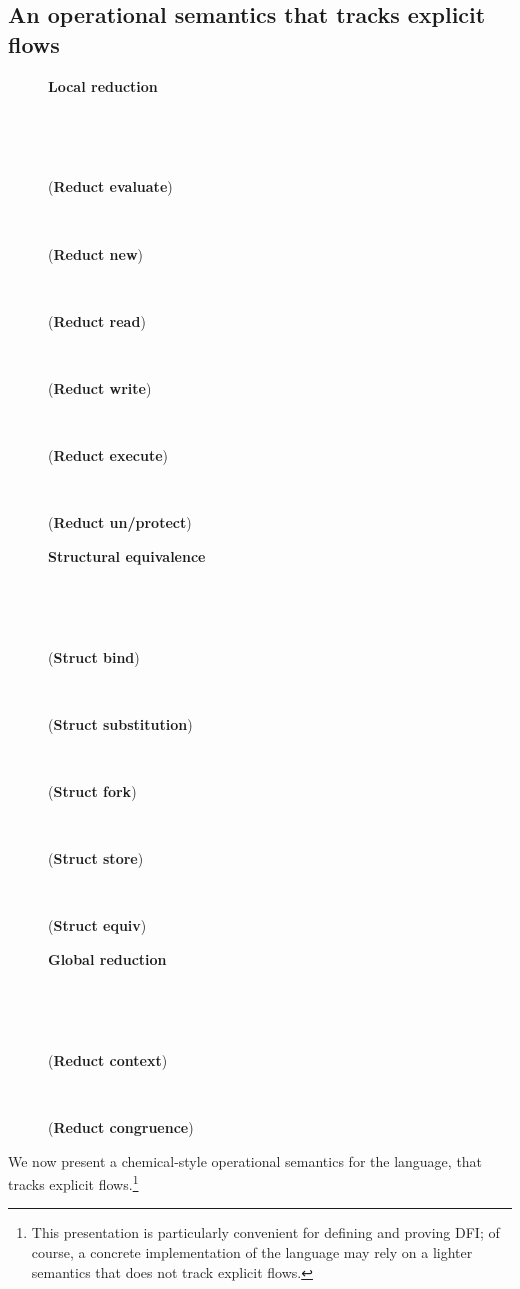 \documentclass{sigplanconf}
\def\upbracketfill{}
\def\downbracketfill{}
\newcommand{\cenvvv}[3]{\vspace{0.8mm}
\begin{flushleft}
\parbox{8.4cm}{{\bf #1} }
\\
\parbox{8.4cm}{\downbracketfill}
\\
\vspace{-0.2cm}
\end{flushleft}
#3
\begin{flushleft}
\parbox{8.4cm}{\upbracketfill}
\end{flushleft}}
\newcommand{\labp}{\mathsf P}
\newcommand{\actsub}[1]{\stackrel{#1;\sigma}{\longrightarrow}~}
\begin{document}
\subsection{An operational semantics that tracks explicit flows}\label{semantics}
\begin{figure}
\cenvvv{Local reduction}{a \actsub{\labp} b\textcolor{white}{p}}{
({\bf Reduct evaluate})\vspace{-1mm}

~

({\bf Reduct new})\vspace{-1mm}

~

({\bf Reduct read})\vspace{-2.5mm}

~

({\bf Reduct write})\vspace{-1mm}

~

({\bf Reduct execute})\vspace{-1mm}

~

({\bf Reduct un/protect})\vspace{-1mm}

}
\vspace{-2mm}
\cenvvv{Structural equivalence}{a \equiv b}{
({\bf Struct bind})\vspace{-1mm}

~

({\bf Struct substitution})\vspace{-0mm}

~

({\bf Struct fork})\vspace{-1mm}

~

({\bf Struct store})\vspace{-1mm}

~

({\bf Struct equiv})\vspace{-2.5mm}

}
\vspace{-2mm}
\cenvvv{Global reduction}{a \actsub{\labp} b\textcolor{white}{p}}{
({\bf Reduct context})\vspace{-1mm}

~

({\bf Reduct congruence})\vspace{-1mm}

}
\end{figure}
We now present a chemical-style operational semantics for the language, that tracks explicit flows.\footnote{This presentation is particularly convenient for defining and proving DFI; of course, a concrete implementation of the language may rely on a lighter semantics that does not track explicit flows.}
\end{document}
